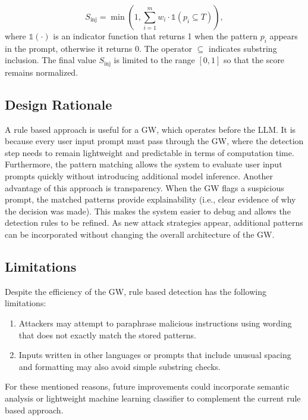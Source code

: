 \documentclass[conference]{IEEEtran}
\begin{document}
\begin{equation}
S_{\text{inj}} = \min \left( 1, \sum_{i=1}^{m} w_i \cdot \mathbb{1}(p_i \subseteq T) \right),
\label{eq:injscore}
\end{equation}
where $\mathbb{1}(\cdot)$ is an indicator function that returns 1 when the pattern $p_i$ appears in the prompt, otherwise it returns $0$. The operator $\subseteq$ indicates substring inclusion. The final value $S_{\text{inj}}$ is limited to the range $[0,1]$ so that the score remains normalized.

\subsection{Design Rationale}

A rule based approach is useful for a GW, which operates before the LLM. It is because every user input prompt must pass through the GW, where the detection step needs to remain lightweight and predictable in terms of computation time. Furthermore, the pattern matching allows the system to evaluate user input prompts quickly without introducing additional model inference. Another advantage of this approach is transparency. When the GW flags a suspicious prompt, the matched patterns provide explainability (i.e., clear evidence of why the decision was made). This makes the system easier to debug and allows the detection rules to be refined. As new attack strategies appear, additional patterns can be incorporated without changing the overall architecture of the GW.

\subsection{Limitations}

Despite the efficiency of the GW, rule based detection has the following limitations: 

\begin{enumerate}
    \item Attackers may attempt to paraphrase malicious instructions using wording that does not exactly match the stored patterns.
    \item Inputs written in other languages or prompts that include unusual spacing and formatting may also avoid simple substring checks.
\end{enumerate}
 
 For these mentioned reasons, future improvements could incorporate semantic analysis or lightweight machine learning classifier to complement the current rule based approach.
\end{document}
